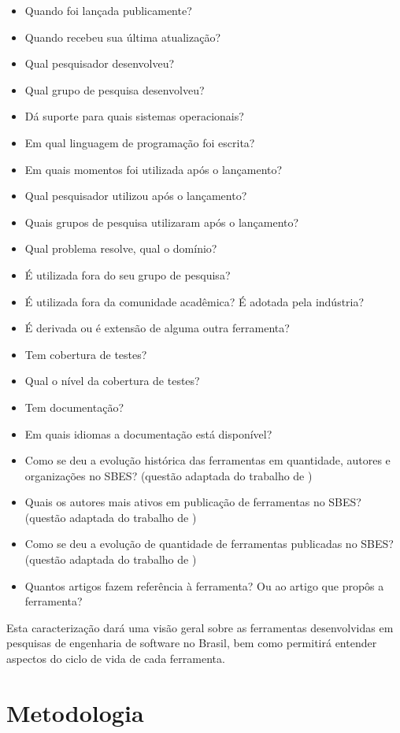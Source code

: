 \documentclass[conference]{IEEEtran}
\begin{document}
\begin{itemize}
\item Quando foi lançada publicamente?
\item Quando recebeu sua última atualização?
\item Qual pesquisador desenvolveu?
\item Qual grupo de pesquisa desenvolveu?
\item Dá suporte para quais sistemas operacionais?
\item Em qual linguagem de programação foi escrita?
\item Em quais momentos foi utilizada após o lançamento?
\item Qual pesquisador utilizou após o lançamento?
\item Quais grupos de pesquisa utilizaram após o lançamento?
\item Qual problema resolve, qual o domínio?
\item É utilizada fora do seu grupo de pesquisa?
\item É utilizada fora da comunidade acadêmica? É adotada pela indústria?
\item É derivada ou é extensão de alguma outra ferramenta?
\item Tem cobertura de testes?
\item Qual o nível da cobertura de testes?
\item Tem documentação?
\item Em quais idiomas a documentação está disponível?
\item Como se deu a evolução histórica das ferramentas em quantidade, autores
  e organizações no SBES? (questão adaptada do trabalho de
  \cite{Cavalcanti11})
\item Quais os autores mais ativos em publicação de ferramentas no SBES?
  (questão adaptada do trabalho de \cite{Cavalcanti11})
\item Como se deu a evolução de quantidade de ferramentas publicadas no SBES?
  (questão adaptada do trabalho de \cite{Cavalcanti11})
\item Quantos artigos fazem referência à ferramenta? Ou ao artigo que propôs a
  ferramenta?
\end{itemize}

Esta caracterização dará uma visão geral sobre as ferramentas desenvolvidas em
pesquisas de engenharia de software no Brasil, bem como permitirá entender
aspectos do ciclo de vida de cada ferramenta.

\section{Metodologia}
\end{document}
